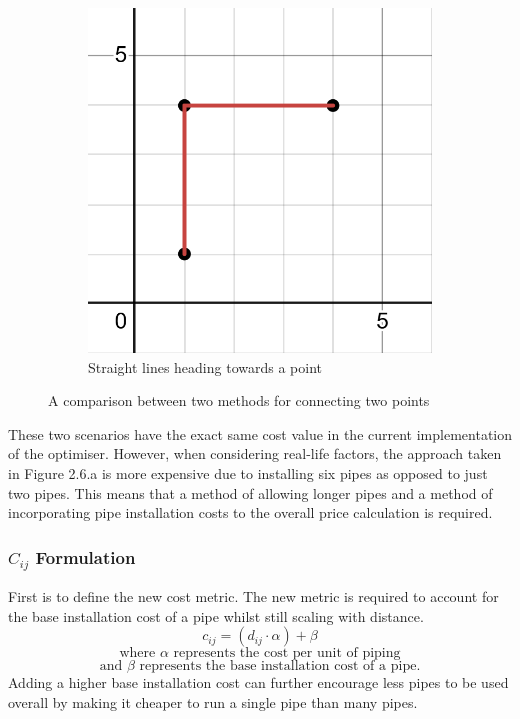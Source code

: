 \begin{figure}[H]
\begin{subfigure}{0.4\linewidth}
        \includegraphics[width=\linewidth]{straightlinetoapoint.png}
        \caption{Straight lines heading towards a point}
    \end{subfigure}
        \caption{A comparison between two methods for connecting two points}
        \label{sinuousvszigzag}
\end{figure}

These two scenarios have the exact same cost value in the current implementation of the optimiser. However, when considering real-life factors, the approach taken in Figure 2.6.a is more expensive due to installing six pipes as opposed to just two pipes. This means that a method of allowing longer pipes and a method of incorporating pipe installation costs to the overall price calculation is required.

\subsubsection{$C_{ij}$ Formulation}\label{definingcost}
First is to define the new cost metric. The new metric is required to account for the base installation cost of a pipe whilst still scaling with distance.
\[
c_{ij} = (d_{ij} \cdot \alpha) + \beta
\]
\[
\text{where $\alpha$ represents the cost per unit of piping}
\]
\[
\text{and $\beta$ represents the base installation cost of a pipe.}
\]
Adding a higher base installation cost can further encourage less pipes to be used overall by making it cheaper to run a single pipe than many pipes.

